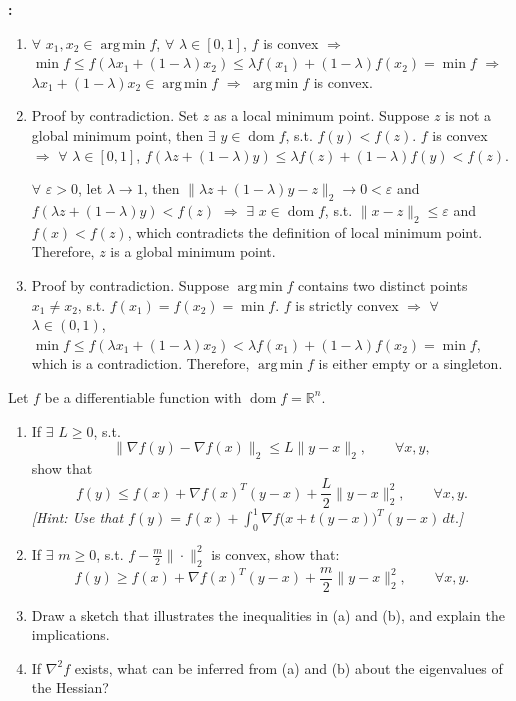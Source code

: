 \documentclass[11pt,letter,notitlepage]{article}
\theoremstyle{definition}
\begin{document}
\newpage
\begin{solution}\textbf{:}
\begin{enumerate}
    \item[(a)] $\forall$ $x_1, x_2 \in \operatorname*{arg\,min} f$, $\forall$ $\lambda \in [0,1]$, $f$ is convex $\Longrightarrow$ $\min f \leq f(\lambda x_1 + (1-\lambda) x_2) \le \lambda f(x_1) + (1-\lambda) f(x_2) = \min f$ $\Longrightarrow$ $\lambda x_1 + (1-\lambda) x_2 \in \operatorname*{arg\,min} f$ $\Longrightarrow$ $\operatorname*{arg\,min} f$ is convex.
    \item[(b)] Proof by contradiction. Set $z$ as a local minimum point. Suppose $z$ is not a global minimum point, then $\exists$ $y \in \operatorname{dom} f$, s.t. $f(y) < f(z)$. $f$ is convex $\Longrightarrow$ $\forall$ $\lambda \in [0,1]$, $f(\lambda z + (1-\lambda) y) \le \lambda f(z) + (1-\lambda) f(y) < f(z)$.
    
    $\forall$ $\varepsilon > 0$, let $\lambda \to 1$, then $\|\lambda z + (1-\lambda) y - z\|_2 \to 0 < \varepsilon$ and $f(\lambda z + (1-\lambda) y) < f(z)$ $\Longrightarrow$ $\exists$ $x \in \operatorname{dom} f$, s.t. $\|x-z\|_2 \le \varepsilon$ and $f(x) < f(z)$, which contradicts the definition of local minimum point. Therefore, $z$ is a global minimum point.
    \item[(c)] Proof by contradiction. Suppose $\operatorname*{arg\,min} f$ contains two distinct points $x_1 \neq x_2$, s.t. $f(x_1) = f(x_2) = \min f$. $f$ is strictly convex $\Longrightarrow$ $\forall$ $\lambda \in (0,1)$, $\min f \leq f(\lambda x_1 + (1-\lambda) x_2) < \lambda f(x_1) + (1-\lambda) f(x_2) = \min f$, which is a contradiction. Therefore, $\operatorname*{arg\,min} f$ is either empty or a singleton.
\end{enumerate}
\end{solution}

\newpage
\begin{exercise}[ ]
Let $f$ be a differentiable function with $\operatorname{dom} f = \mathbb{R}^n$.

\begin{enumerate}
    \item[(a)] If $\exists$ $L \ge 0$, s.t.
    \[
    \|\nabla f(y)-\nabla f(x)\|_2 \le L\|y-x\|_2, \qquad \forall x,y,
    \]
    show that
    \[
    f(y) \le f(x) + \nabla f(x)^T (y-x) + \frac{L}{2}\|y-x\|_2^2, 
    \qquad \forall x,y.
    \]
    \textit{[Hint: Use that
    $
    f(y)=f(x)+\int_0^1 \nabla f\bigl(x+t(y-x)\bigr)^T (y-x)\,dt.
    $]}
    
    \item[(b)] If $\exists$ $m \ge 0$, s.t. $f - \frac{m}{2}\|\cdot\|_2^2$ is convex, show that:
    \[
    f(y) \ge f(x) + \nabla f(x)^T (y-x) + \frac{m}{2}\|y-x\|_2^2,
    \qquad \forall x,y.
    \]
    
    \item[(c)] Draw a sketch that illustrates the inequalities in (a) and (b), and explain the implications.
    
    \item[(d)] If $\nabla^2 f$ exists, what can be inferred from (a) and (b) about the eigenvalues of the Hessian?
\end{enumerate}
\end{exercise}
\end{document}
